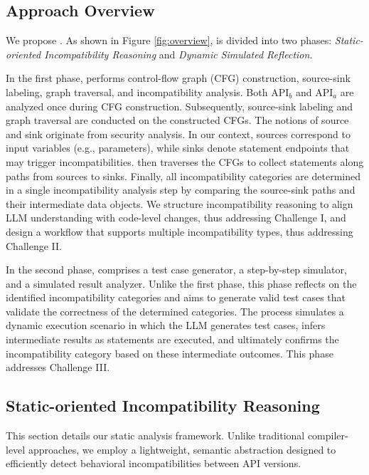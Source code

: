 


\subsection{Approach Overview}\label{subsec:approach_overview}

We propose \tool. As shown in Figure \ref{fig:overview}, \tool is divided into two phases: \textit{Static-oriented Incompatibility Reasoning} and \textit{Dynamic Simulated Reflection}.

In the first phase, \tool performs control-flow graph (CFG) construction, source-sink labeling, graph traversal, and incompatibility analysis. Both API$_b$ and API$_a$ are analyzed once during CFG construction. Subsequently, source-sink labeling and graph traversal are conducted on the constructed CFGs. The notions of source and sink originate from security analysis. In our context, sources correspond to input variables (e.g., parameters), while sinks denote statement endpoints that may trigger incompatibilities. \tool then traverses the CFGs to collect statements along paths from sources to sinks. Finally, all incompatibility categories are determined in a single incompatibility analysis step by comparing the source-sink paths and their intermediate data objects. We structure incompatibility reasoning to align LLM understanding with code-level changes, thus addressing Challenge I, and design a workflow that supports multiple incompatibility types, thus addressing Challenge II.


In the second phase, \tool comprises a test case generator, a step-by-step simulator, and a simulated result analyzer. Unlike the first phase, this phase reflects on the identified incompatibility categories and aims to generate valid test cases that validate the correctness of the determined categories. The process simulates a dynamic execution scenario in which the LLM generates test cases, infers intermediate results as statements are executed, and ultimately confirms the incompatibility category based on these intermediate outcomes. This phase addresses Challenge III.


\subsection{Static-oriented Incompatibility Reasoning}\label{subsec:static_reasoning}

This section details our static analysis framework. Unlike traditional compiler-level approaches, we employ a lightweight, semantic abstraction designed to efficiently detect behavioral incompatibilities between API versions.

